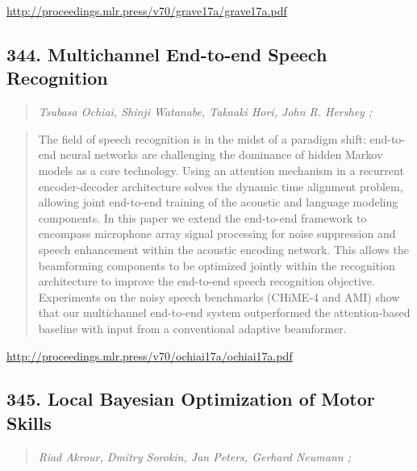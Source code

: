 \documentclass{article}
\begin{document}
\href{http://proceedings.mlr.press/v70/grave17a/grave17a.pdf}{http://proceedings.mlr.press/v70/grave17a/grave17a.pdf}

\subsection{344. Multichannel End-to-end Speech Recognition}

\begin{quote}
\footnotesize{\textit{Tsubasa Ochiai, Shinji Watanabe, Takaaki Hori, John R. Hershey ;}}
\end{quote}

\begin{quote}
    The field of speech recognition is in the midst of a paradigm shift: end-to-end neural networks are challenging the dominance of hidden Markov models as a core technology. Using an attention mechanism in a recurrent encoder-decoder architecture solves the dynamic time alignment problem, allowing joint end-to-end training of the acoustic and language modeling components. In this paper we extend the end-to-end framework to encompass microphone array signal processing for noise suppression and speech enhancement within the acoustic encoding network. This allows the beamforming components to be optimized jointly within the recognition architecture to improve the end-to-end speech recognition objective. Experiments on the noisy speech benchmarks (CHiME-4 and AMI) show that our multichannel end-to-end system outperformed the attention-based baseline with input from a conventional adaptive beamformer.  \end{quote}

\href{http://proceedings.mlr.press/v70/ochiai17a/ochiai17a.pdf}{http://proceedings.mlr.press/v70/ochiai17a/ochiai17a.pdf}

\subsection{345. Local Bayesian Optimization of Motor Skills}

\begin{quote}
\footnotesize{\textit{Riad Akrour, Dmitry Sorokin, Jan Peters, Gerhard Neumann ;}}
\end{quote}
\end{document}

